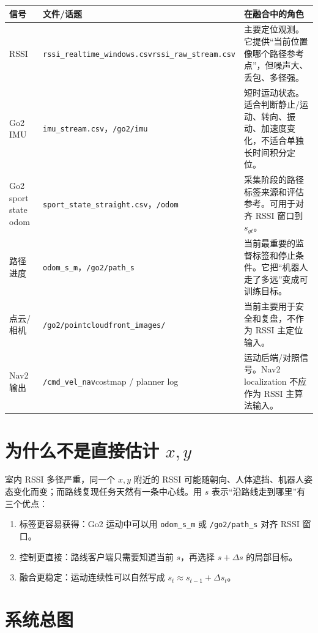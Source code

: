 \documentclass[11pt,a4paper,openany]{report}
\newcommand{\file}[1]{\nolinkurl{#1}}
\newcommand{\topic}[1]{\nolinkurl{#1}}
\newcommand{\csvcol}[1]{\nolinkurl{#1}}
\begin{document}
\begin{footnotesize}
\begin{longtable}{L{0.16\textwidth}L{0.34\textwidth}L{0.40\textwidth}}
\toprule
信号 & 文件/话题 & 在融合中的角色 \\
\midrule
RSSI & \file{rssi_realtime_windows.csv}\newline \file{rssi_raw_stream.csv} & 主要定位观测。它提供“当前位置像哪个路径参考点”，但噪声大、丢包、多径强。 \\
Go2 IMU & \file{imu_stream.csv}，\topic{/go2/imu} & 短时运动状态。适合判断静止/运动、转向、振动、加速度变化，不适合单独长时间积分定位。 \\
Go2 sport state odom & \file{sport_state_straight.csv}，\topic{/odom} & 采集阶段的路径标签来源和评估参考。可用于对齐 RSSI 窗口到 \(s_{gt}\)。 \\
路径进度 & \csvcol{odom_s_m}，\topic{/go2/path_s} & 当前最重要的监督标签和停止条件。它把“机器人走了多远”变成可训练目标。 \\
点云/相机 & \topic{/go2/pointcloud}\newline \file{front_images/} & 当前主要用于安全和复盘，不作为 RSSI 主定位输入。 \\
Nav2 输出 & \topic{/cmd_vel_nav}\newline costmap / planner log & 运动后端/对照信号。Nav2 localization 不应作为 RSSI 主算法输入。 \\
\bottomrule
\end{longtable}
\end{footnotesize}

\section{为什么不是直接估计 \(x,y\)}

室内 RSSI 多径严重，同一个 \(x,y\) 附近的 RSSI 可能随朝向、人体遮挡、机器人姿态变化而变；而路线复现任务天然有一条中心线。用 \(s\) 表示“沿路线走到哪里”有三个优点：

\begin{enumerate}
  \item 标签更容易获得：Go2 运动中可以用 \csvcol{odom_s_m} 或 \topic{/go2/path_s} 对齐 RSSI 窗口。
  \item 控制更直接：路线客户端只需要知道当前 \(s\)，再选择 \(s+\Delta s\) 的局部目标。
  \item 融合更稳定：运动连续性可以自然写成 \(s_t \approx s_{t-1} + \Delta s_t\)。
\end{enumerate}

\section{系统总图}
\end{document}
